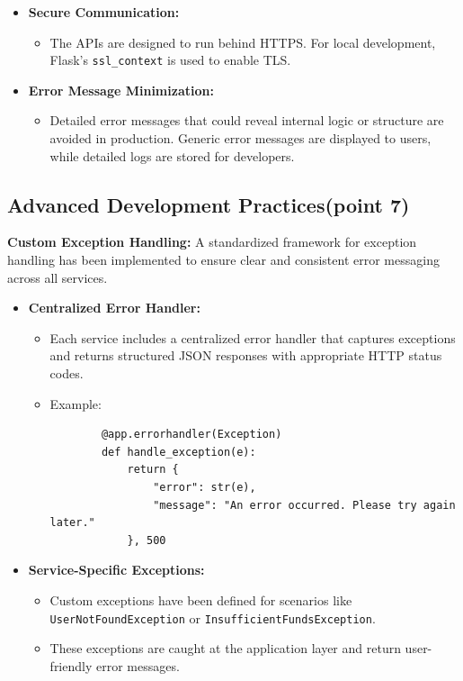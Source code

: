 \documentclass[a4paper,12pt]{article}
\begin{document}
\begin{itemize}
    \item \textbf{Secure Communication:}
    \begin{itemize}
        \item The APIs are designed to run behind HTTPS. For local development, Flask’s \texttt{ssl\_context} is used to enable TLS.
    \end{itemize}

    \item \textbf{Error Message Minimization:}
    \begin{itemize}
        \item Detailed error messages that could reveal internal logic or structure are avoided in production. Generic error messages are displayed to users, while detailed logs are stored for developers.
    \end{itemize}
\end{itemize}

\subsection{Advanced Development Practices(point 7)}

\textbf{Custom Exception Handling:} A standardized framework for exception handling has been implemented to ensure clear and consistent error messaging across all services.

\begin{itemize}
    \item \textbf{Centralized Error Handler:}
    \begin{itemize}
        \item Each service includes a centralized error handler that captures exceptions and returns structured JSON responses with appropriate HTTP status codes.
        \item Example:
        \begin{verbatim}
        @app.errorhandler(Exception)
        def handle_exception(e):
            return {
                "error": str(e),
                "message": "An error occurred. Please try again later."
            }, 500
        \end{verbatim}
    \end{itemize}

    \item \textbf{Service-Specific Exceptions:}
    \begin{itemize}
        \item Custom exceptions have been defined for scenarios like \texttt{UserNotFoundException} or \texttt{InsufficientFundsException}.
        \item These exceptions are caught at the application layer and return user-friendly error messages.
    \end{itemize}
\end{itemize}
\end{document}
